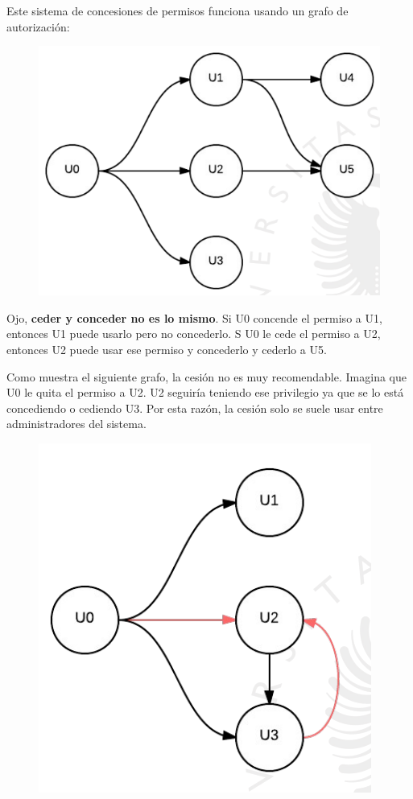 Este sistema de concesiones de permisos funciona usando un grafo de autorización:

\begin{figure}[H]
  \center
  \includegraphics[scale=0.35]{img/15.png}
\end{figure}

Ojo, \textbf{ceder y conceder no es lo mismo}. Si U0 concende el permiso a U1, entonces U1 puede usarlo pero no concederlo. S U0 le cede el permiso a U2,  entonces U2 puede usar ese permiso y concederlo y cederlo a U5.

Como muestra el siguiente grafo, la cesión no es muy recomendable. Imagina que U0 le quita el permiso a U2. U2 seguiría teniendo ese privilegio ya que se lo está concediendo o cediendo U3. Por esta razón, la cesión solo se suele usar entre administradores del sistema.

\begin{figure}[H]
  \center
  \includegraphics[scale=0.35]{img/16.png}
\end{figure}

